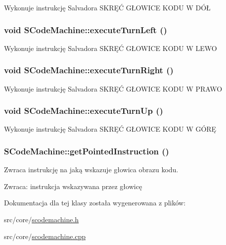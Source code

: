 Wykonuje instrukcję Salvadora SKRĘĆ GŁOWICE KODU W DÓŁ \hypertarget{classSCodeMachine_d8415a221140a08a9383a595336cdf69}{
\subsubsection[{executeTurnLeft}]{\setlength{\rightskip}{0pt plus 5cm}void SCodeMachine::executeTurnLeft ()}}
\label{classSCodeMachine_d8415a221140a08a9383a595336cdf69}


Wykonuje instrukcję Salvadora SKRĘĆ GŁOWICE KODU W LEWO \hypertarget{classSCodeMachine_d48065e7bf42eef9e3a0f81fbb17f301}{
\subsubsection[{executeTurnRight}]{\setlength{\rightskip}{0pt plus 5cm}void SCodeMachine::executeTurnRight ()}}
\label{classSCodeMachine_d48065e7bf42eef9e3a0f81fbb17f301}


Wykonuje instrukcję Salvadora SKRĘĆ GŁOWICE KODU W PRAWO \hypertarget{classSCodeMachine_f2867d02414db096844e4801f9895650}{
\subsubsection[{executeTurnUp}]{\setlength{\rightskip}{0pt plus 5cm}void SCodeMachine::executeTurnUp ()}}
\label{classSCodeMachine_f2867d02414db096844e4801f9895650}


Wykonuje instrukcję Salvadora SKRĘĆ GŁOWICE KODU W GÓRĘ \hypertarget{classSCodeMachine_3c851e80ec35cbebeb78ec8ceed8c5ca}{
\subsubsection[{getPointedInstruction}]{ SCodeMachine::getPointedInstruction ()}}
\label{classSCodeMachine_3c851e80ec35cbebeb78ec8ceed8c5ca}


Zwraca instrukcję na jaką wskazuje głowica obrazu kodu. \begin{Desc}
\item[Zwraca:]instrukcja wskazywana przez głowicę \end{Desc}


Dokumentacja dla tej klasy została wygenerowana z plików:\begin{CompactItemize}
\item 
src/core/\hyperlink{scodemachine_8h}{scodemachine.h}\item 
src/core/\hyperlink{scodemachine_8cpp}{scodemachine.cpp}\end{CompactItemize}
